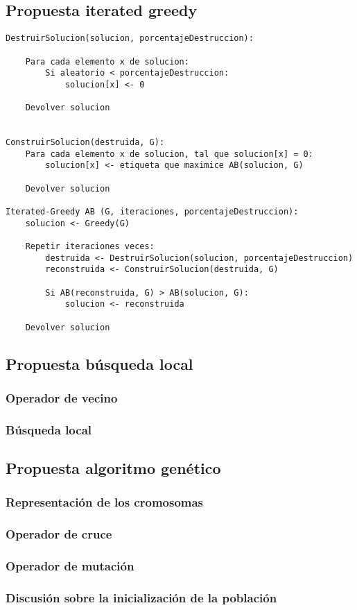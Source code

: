 \subsection{Propuesta iterated greedy}

\begin{lstlisting}
DestruirSolucion(solucion, porcentajeDestruccion):

	Para cada elemento x de solucion:
		Si aleatorio < porcentajeDestruccion:
			solucion[x] <- 0

	Devolver solucion


ConstruirSolucion(destruida, G):
	Para cada elemento x de solucion, tal que solucion[x] = 0:
		solucion[x] <- etiqueta que maximice AB(solucion, G)

	Devolver solucion

Iterated-Greedy AB (G, iteraciones, porcentajeDestruccion):
	solucion <- Greedy(G)

	Repetir iteraciones veces:
		destruida <- DestruirSolucion(solucion, porcentajeDestruccion)
		reconstruida <- ConstruirSolucion(destruida, G)

		Si AB(reconstruida, G) > AB(solucion, G):
			solucion <- reconstruida

	Devolver solucion
\end{lstlisting}

\subsection{Propuesta búsqueda local}

\subsubsection{Operador de vecino}

\subsubsection{Búsqueda local}



\subsection{Propuesta algoritmo genético}

\subsubsection{Representación de los cromosomas}

\subsubsection{Operador de cruce}

\subsubsection{Operador de mutación}

\subsubsection{Discusión sobre la inicialización de la población}
